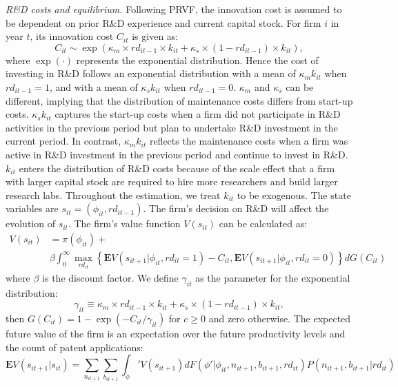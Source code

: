 \documentclass[11pt]{article}
\begin{document}
\textit{R\&D costs and equilibrium.} Following PRVF, the innovation cost is assumed to be dependent on prior R\&D experience and current capital stock. For firm $i$ in year $t$, its innovation cost $C_{it}$ is given as:
\begin{equation}
    C_{it}\sim \exp(\kappa_m\times rd_{it-1}\times k_{it}+\kappa_{s}\times(1-rd_{it-1})\times k_{it}),
\end{equation}
where $\exp(\cdot)$ represents the exponential distribution. Hence the cost of investing in R\&D follows an exponential distribution with a mean of $\kappa_mk_{it}$ when $rd_{it-1}=1$, and with a mean of $\kappa_sk_{it}$ when $rd_{it-1}=0$. $\kappa_m$ and $\kappa_s$ can be different, implying that the distribution of
maintenance costs differs from start-up costs. $\kappa_sk_{it}$ captures the start-up costs when a firm did not participate in R\&D activities in the previous period but plan to undertake R\&D investment in the current period. In contrast, $\kappa_mk_{it}$ reflects the maintenance costs when a firm was active in R\&D investment in the previous period and continue to invest in R\&D.  $k_{it}$ enters the distribution of R\&D costs because of the scale effect that a firm with larger capital stock are required to hire more researchers and build larger research labs. Throughout the estimation, we treat $k_{it}$ to be exogenous. The state variables are $s_{it} = (\phi_{it} ,rd_{it-1})$. The firm’s decision on R\&D will affect the evolution of $s_{it}$. The firm’s value function $V(s_{it})$ can be calculated as:
\begin{align}
    V(s_{it}) &= \pi(\phi_{it}) + \\
              &\beta \int _0^{\infty}\max_{rd_{it}}\left\{\mathbf{E} V(s_{it+1}|\phi_{it},rd_{it}=1)-C_{it}, \mathbf{E}V(s_{it+1}|\phi_{it}, rd_{it}=0)\right\}dG(C_{it}) \nonumber
\end{align}
where $\beta$ is the discount factor. We define $\gamma_{it}$ as the parameter for the exponential distribution:
\[
\gamma_{it}\equiv \kappa_m\times rd_{it-1}\times k_{it}+\kappa_{s}\times(1-rd_{it-1})\times k_{it},    
\]
then $G(C_{it})=1-\exp(-C_{it}/\gamma_{it})$ for $c\geq0$ and zero otherwise. The expected future value of the firm is an expectation over the future productivity levels and the count of patent applications:
\begin{equation}\label{vf}
    \mathbf{E}V(s_{it+1}|s_{it}) = \sum_{n_{it+1}}\sum_{b_{it+1}}\int_\phi' V(s_{it+1})dF(\phi'|\phi_{it}, n_{it+1}, b_{it+1}, rd_{it}) P(n_{it+1}, b_{it+1}|rd_{it})
\end{equation}
\end{document}
